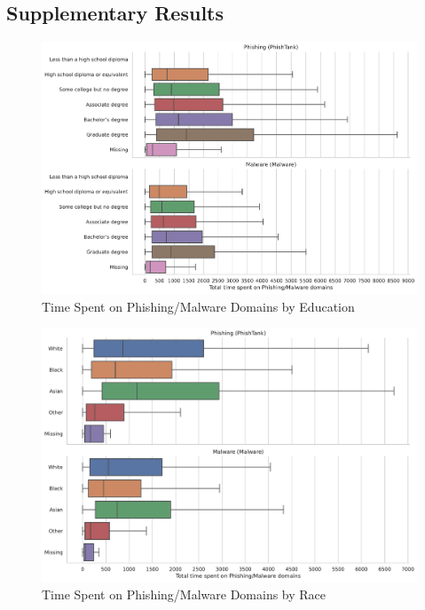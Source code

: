 \documentclass[12pt, letterpaper]{article}
\begin{document}
\clearpage
\subsection{Supplementary Results}

\begin{figure}[!htb]
  \centering
  \caption{Time Spent on Phishing/Malware Domains by Education}
	\label{fig:total_time_phishing_malware_educ}
	\includegraphics[width=\textwidth]{figs/total_time_phishing_malware_educ.pdf}
\end{figure}

\begin{figure}[!htb]
  \centering
  \caption{Time Spent on Phishing/Malware Domains by Race}
	\label{fig:prop_total_time_phishing_malware_race}
	\includegraphics[width=\textwidth]{figs/total_time_phishing_malware_race.pdf}
	\end{figure}
\end{document}
